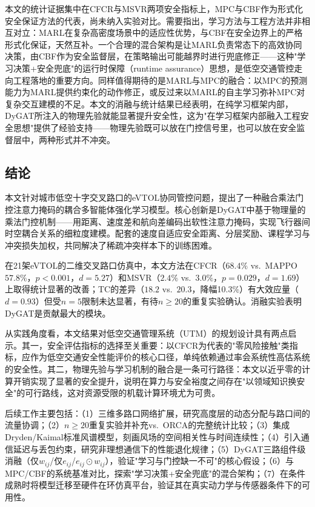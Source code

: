 \documentclass[12pt,a4paper,UTF8]{ctexart}
\begin{document}
本文的统计证据集中在CFCR与MSVR两项安全指标上，MPC与CBF作为形式化安全保证方法的代表，尚未纳入实验对比。需要指出，学习方法与工程方法并非相互对立：MARL在复杂高密度场景中的适应性优势，与CBF在安全边界上的严格形式化保证，天然互补。一个合理的混合架构是让MARL负责常态下的高效协同决策，由CBF作为安全监督层，在策略输出可能越界时进行兜底修正——这种"学习决策+安全兜底"的运行时保障（runtime assurance）思想，是低空交通管控走向工程落地的重要方向。同样值得期待的是MARL与MPC的融合：以MPC的预测能力为MARL提供约束化的动作修正，或反过来以MARL的自主学习弥补MPC对复杂交互建模的不足。本文的消融与统计结果已经表明，在纯学习框架内部，DyGAT所注入的物理先验就能显著提升安全性，这为"在学习框架内部融入工程安全思想"提供了经验支持——物理先验既可以放在门控信号里，也可以放在安全监督层中，两种形式并不冲突。

\subsection{结论}

本文针对城市低空十字交叉路口的eVTOL协同管控问题，提出了一种融合乘法门控注意力掩码的耦合多智能体强化学习模型。核心创新是DyGAT中基于物理量的乘法门控机制——用距离、速度差和航向差编码出软性注意力掩码，实现飞行器间时空耦合关系的细粒度建模。配套的速度自适应安全距离、分层奖励、课程学习与冲突损失加权，共同解决了稀疏冲突样本下的训练困难。

在21架eVTOL的二维交叉路口仿真中，本文方法在CFCR（$68.4\%$ vs.\ MAPPO $57.8\%$，$p<0.001$，$d=5.27$）和MSVR（$2.4\%$ vs.\ $3.0\%$，$p=0.029$，$d=1.69$）上取得统计显著的改善；TC的差异（$18.2$ vs.\ $20.3$，降幅10.3\%）有大效应量（$d=0.93$）但受$n=5$限制未达显著，有待$n\geq20$的重复实验确认。消融实验表明DyGAT是贡献最大的模块。

从实践角度看，本文结果对低空交通管理系统（UTM）的规划设计具有两点启示。其一，安全评估指标的选择至关重要：以CFCR为代表的"零风险接触"类指标，应作为低空交通安全性能评价的核心口径，单纯依赖通过率会系统性高估系统的安全性。其二，物理先验与学习机制的融合是一条可行路径：本文以近乎零的计算开销实现了显著的安全提升，说明在算力与安全裕度之间存在"以领域知识换安全"的可行路线，这对资源受限的机载计算环境尤为可贵。

后续工作主要包括：（1）三维多路口网络扩展，研究高度层的动态分配与路口间的流量协调；（2）$n\geq20$重复实验并补充vs.\ ORCA的完整统计比较；（3）集成Dryden/Kaimal标准风谱模型，刻画风场的空间相关性与时间连续性；（4）引入通信延迟与丢包约束，研究非理想通信下的性能退化规律；（5）DyGAT三路组件级消融（仅$w_{ij}$/仅$e_{ij}$/$e_{ij}\odot w_{ij}$），验证"学习与门控缺一不可"的核心假设；（6）与MPC/CBF的系统基准对比，探索"学习决策+安全兜底"的混合架构；（7）在条件成熟时将模型迁移至硬件在环仿真平台，验证其在真实动力学与传感器条件下的可用性。
\end{document}
